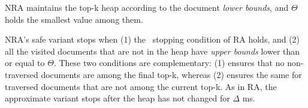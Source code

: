 NRA maintains the top-k heap according to the document \emph{lower bounds}, and $\Theta$ holds the smallest value among them. 


NRA's safe variant stops when (1) the \RAStop\ stopping condition of RA holds, 
and (2) all the visited documents that are not in the heap have \emph{upper bounds} lower than or equal to $\Theta$. These two conditions are complementary: (1) ensures that no non-traversed documents are among the final top-k, whereas (2) ensures the same for traversed documents that are not among the current top-k. 
As in RA, the approximate variant stops after the heap has not changed for $\Delta$ ms.

